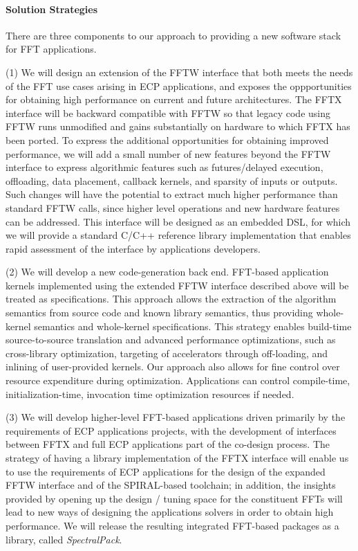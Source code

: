 \paragraph{Solution Strategies} 
There are three components to our approach to providing a new software stack for FFT applications.

\begin{trivlist}
\item
(1) We will design an extension of the FFTW interface that both meets the needs of the FFT use cases arising in ECP applications, and exposes the
oppportunities for obtaining high performance on current and future 
architectures. The FFTX interface will be 
backward compatible with FFTW so that legacy code using FFTW runs unmodified and gains substantially on hardware to which FFTX has been ported.
To express the additional opportunities for obtaining improved performance, we will add a small number of new features beyond the FFTW interface to express algorithmic features such as futures/delayed execution,
offloading, data placement, callback kernels, and sparsity of inputs or outputs. Such changes will have the potential to extract
much higher performance than standard FFTW calls, since higher level operations and new hardware features can be addressed. This interface will be designed as an embedded DSL, for which we will provide a standard C/C++ reference library implementation that enables rapid assessment of the interface by applications developers.
\item
(2) We will develop a new code-generation back end. FFT-based application kernels implemented using the extended FFTW interface described above will be treated as specifications. This approach allows the extraction of the algorithm semantics from source code and known library semantics, thus providing whole-kernel semantics and whole-kernel specifications. This strategy enables build-time source-to-source translation and advanced performance optimizations, such as
cross-library optimization, targeting of accelerators through off-loading, and inlining of user-provided kernels.
Our approach also allows for fine control over resource expenditure during optimization. Applications can control compile-time, initialization-time, invocation time optimization resources if needed.
\item
(3) We will develop higher-level FFT-based applications driven primarily by the requirements of ECP applications projects, with the development of interfaces between FFTX and full ECP applications part of the co-design process. The strategy of having a library implementation of the FFTX interface will enable us to use the requirements of ECP applications for the design of the expanded FFTW interface and of the SPIRAL-based toolchain; in addition, the insights provided by opening up the design / tuning space for the constituent FFTs will lead to new ways of designing the applications solvers in order to obtain high performance. We will release the resulting integrated FFT-based packages as a library, called {\em SpectralPack}.

\end{trivlist}

